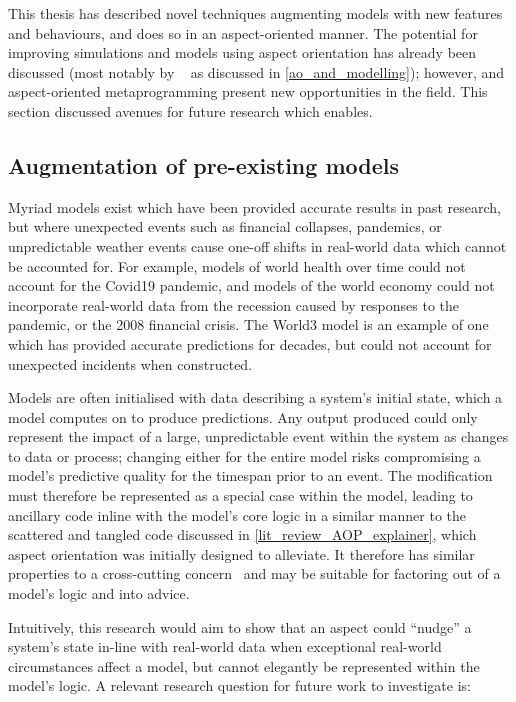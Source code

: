 This thesis has described novel techniques augmenting models with new features
and behaviours, and does so in an aspect-oriented manner. The potential for
improving simulations and models using aspect orientation has already been
discussed (most notably by \citeauthor{gulyas1999use}~\cite{gulyas1999use} as
discussed in \cref{ao_and_modelling}); however, \pdsf and aspect-oriented
metaprogramming present new opportunities in the field. This section discussed
avenues for future research which \pdsf enables.


\subsection{Augmentation of pre-existing models}\label{future_work_nudge_model_state}

Myriad models exist which have been provided accurate results in past research,
but where unexpected events such as financial collapses, pandemics, or
unpredictable weather events cause one-off shifts in real-world data which
cannot be accounted for. For example, models of world health over time could not
account for the Covid19 pandemic, and models of the world economy could not
incorporate real-world data from the recession caused by responses to the
pandemic, or the 2008 financial crisis. The World3 model is an example of one
which has provided accurate predictions for decades, but could not account for unexpected incidents when constructed.

Models are often initialised with data describing a system's initial state,
which a model computes on to produce predictions. Any output produced could only
represent the impact of a large, unpredictable event within the system as
changes to data or process; changing either for the entire model risks
compromising a model's predictive quality for the timespan prior to an event.
The modification must therefore be represented as a special case within the
model, leading to ancillary code inline with the model's core logic in a similar
manner to the scattered and tangled code discussed in
\cref{lit_review_AOP_explainer}, which aspect orientation was initially designed
to alleviate. It therefore has similar properties to a cross-cutting
concern~\cite{kiczales1997aspect} and may be suitable for factoring out of a
model's logic and into advice.

Intuitively, this research would aim to show that an aspect could ``nudge'' a
system's state in-line with real-world data when exceptional real-world
circumstances affect a model, but cannot elegantly be represented within the
model's logic. A relevant research question for future work to investigate is:


